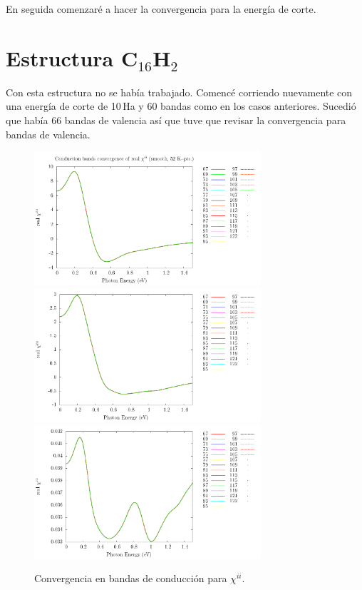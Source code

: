 \documentclass[11pt]{article}
\begin{document}
En seguida comenzar\'e a hacer la convergencia para la energ\'ia de corte.

\section{Estructura C$_{16}$H$_{2}$}

Con esta estructura no se hab\'ia trabajado. Comenc\'e corriendo nuevamente con una energ\'ia de corte de 10\,Ha y 60 bandas como en los casos anteriores. Sucedi\'o que hab\'ia 66 bandas de valencia as\'i que tuve que revisar la convergencia para bandas de valencia.


\begin{figure}
	\begin{center}
		\includegraphics[width=0.75\textwidth]{./figures/12.5/res1_chi_1_sm_NCconv.pdf}\\
		\includegraphics[width=0.75\textwidth]{./figures/12.5/res1_chi_2_sm_NCconv.pdf}\\
		\includegraphics[width=0.75\textwidth]{./figures/12.5/res1_chi_3_sm_NCconv.pdf}
	\end{center}
	\caption{Convergencia en bandas de conducci\'on para $\chi^{ii}$.}
	\label{fig:chi_12.5}
\end{figure}
\end{document}
